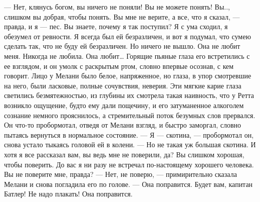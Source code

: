 — Нет, клянусь богом, вы ничего не поняли! Вы не можете понять! Вы.., слишком вы добрая, чтобы понять. Вы мне не верите, а все, что я сказал, — правда, и я — пес. Вы знаете, почему я так поступил? Я с ума сходил, я обезумел от ревности. Я всегда был ей безразличен, и вот я подумал, что сумею сделать так, что не буду ей безразличен. Но ничего не вышло. Она не любит меня. Никогда не любила. Она любит…
Горящие пьяные глаза его встретились с ее взглядом, и он умолк с раскрытым ртом, словно впервые осознав, с кем говорит. Лицо у Мелани было белое, напряженное, но глаза, в упор смотревшие на него, были ласковые, полные сочувствия, неверия. Эти мягкие карие глаза светились безмятежностью, из глубины их смотрела такая наивность, что у Ретта возникло ощущение, будто ему дали пощечину, и его затуманенное алкоголем сознание немного прояснилось, а стремительный поток безумных слов прервался. Он что-то пробормотал, отведя от Мелани взгляд, и быстро заморгал, словно пытаясь вернуться в нормальное состояние.
— Я — скотина, — пробормотал он, снова устало тыкаясь головой ей в колени. — Но не такая уж большая скотина. И хотя я все рассказал вам, вы ведь мне не поверили, да? Вы слишком хорошая, чтобы поверить. До вас я ни разу не встречал по-настоящему хорошего человека. Вы не поверите мне, правда?
— Нет, не поверю, — примирительно сказала Мелани и снова погладила его по голове. — Она поправится. Будет вам, капитан Батлер! Не надо плакать! Она поправится.

